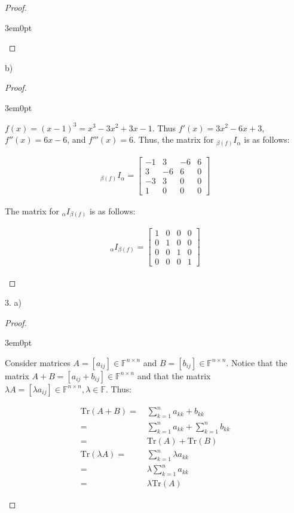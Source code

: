 \documentclass[11pt]{article}
\newcommand{\F}{\mathbb{F}}
\newenvironment{myproof}
{\begin{proof} \begin{adjustwidth}{3em}{0pt}$ $\par\nobreak\ignorespaces}
{\end{adjustwidth} \end{proof}}
\begin{document}
\begin{flushleft}
\begin{myproof}
\end{myproof}

b)

\begin{myproof}

$f(x) = (x-1)^3 = x^3 -3x^2 +3x-1$. Thus $f'(x) = 3x^2 - 6x + 3$, $f''(x) = 6x - 6$, and $f'''(x) = 6$. Thus, the matrix for $_{\beta (f)}I_\alpha$ is as follows:

\begin{align*}
_{\beta (f)}I_\alpha = \begin{bmatrix}
-1 & 3 & -6 & 6 \\
3 & -6 & 6 & 0 \\
-3 & 3 & 0 & 0\\
1 & 0 & 0 & 0
\end{bmatrix}
\end{align*}

The matrix for $_{\alpha}I_{\beta (f)}$ is as follows:

\begin{align*}
_{\alpha}I_{\beta (f)} = \begin{bmatrix}
1 & 0 & 0 & 0 \\
0 & 1 & 0 & 0 \\
0 & 0 & 1 & 0 \\
0 & 0 & 0 & 1
\end{bmatrix}
\end{align*}

\end{myproof}

\newpage

3. a)

\begin{myproof}

Consider matrices $A = [a_{ij}] \in \F^{n \times n}$ and $B = [b_{ij}] \in \F^{n \times n}$. Notice that  the matrix $A + B = [a_{ij} + b_{ij}] \in \F^{n \times n}$ and that the matrix $\lambda A = [ \lambda a_{ij}] \in \F^{n \times n}, \lambda \in \F$. Thus:

\begin{align*}
\text{Tr}(A + B) = & \ \sum_{k = 1}^n a_{kk} + b_{kk} \\
= & \ \sum_{k = 1}^n a_{kk} + \sum_{k = 1}^n b_{kk} \\
= & \ \text{Tr}(A) + \text{Tr}(B) \\
\text{Tr}(\lambda A) = & \ \sum_{k = 1}^n \lambda a_{kk} \\
= & \ \lambda \sum_{k = 1}^n a_{kk} \\
= & \ \lambda \text{Tr}(A)
\end{align*}


\end{myproof}
\end{flushleft}
\end{document}
